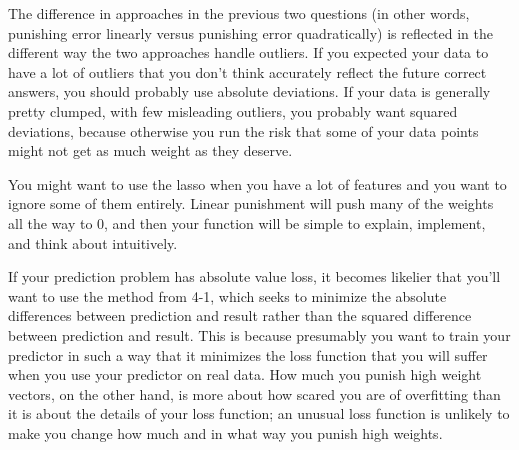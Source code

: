 \documentclass[12pt]{article}
\begin{document}
The difference in approaches in the previous two questions (in other words, punishing error linearly versus punishing error quadratically) is reflected in the different way the two approaches handle outliers. If you expected your data to have a lot of outliers that you don't think accurately reflect  the future correct answers, you should probably use absolute deviations. If your data is generally pretty clumped, with few misleading outliers, you probably want squared deviations, because otherwise you run the risk that some of your data points might not get as much weight as they deserve. 

You might want to use the lasso when you have a lot of features and you want to ignore some of them entirely. Linear punishment will push many of the weights all the way to 0, and then your function will be simple to explain, implement, and think about intuitively.

If your prediction problem has absolute value loss, it becomes likelier that you'll want to use the method from 4-1, which seeks to minimize the absolute differences between prediction and result rather than the squared difference between prediction and result. This is because presumably you want to train your predictor in such a way that it minimizes the loss function that you will suffer when you use your predictor on real data. How much you punish high weight vectors, on the other hand, is more about how scared you are of overfitting than it is about the details of your loss function; an unusual loss function is unlikely to make you change how much and in what way you punish high weights.
\end{document}
